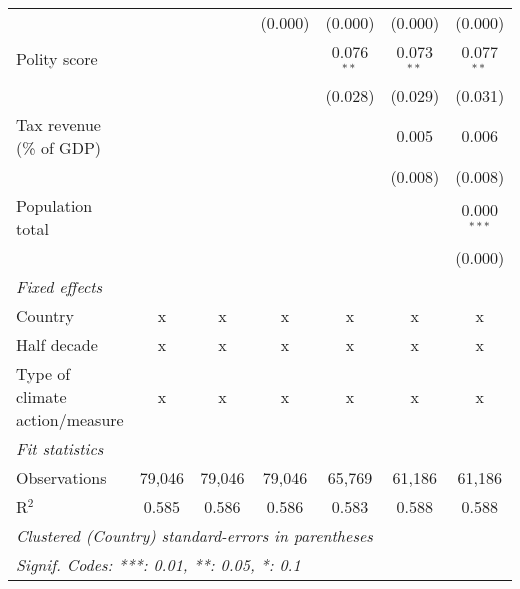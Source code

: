 \begin{tabular}{lcccccc}
                                                                                     &               &               & (0.000)       & (0.000)       & (0.000)       & (0.000)\\   
   Polity score                                                                      &               &               &               & 0.076$^{**}$  & 0.073$^{**}$  & 0.077$^{**}$\\   
                                                                                     &               &               &               & (0.028)       & (0.029)       & (0.031)\\   
   Tax revenue (\% of GDP)                                                           &               &               &               &               & 0.005         & 0.006\\   
                                                                                     &               &               &               &               & (0.008)       & (0.008)\\   
   Population total                                                                  &               &               &               &               &               & 0.000$^{***}$\\   
                                                                                     &               &               &               &               &               & (0.000)\\   
   \emph{Fixed effects}\\
   Country                                                                           & x             & x             & x             & x             & x             & x\\  
   Half decade                                                                       & x             & x             & x             & x             & x             & x\\  
   Type of climate action/measure                                                    & x             & x             & x             & x             & x             & x\\  
   \midrule \emph{Fit statistics}\\
   Observations                                                                      & 79,046        & 79,046        & 79,046        & 65,769        & 61,186        & 61,186\\  
   R$^2$                                                                             & 0.585         & 0.586         & 0.586         & 0.583         & 0.588         & 0.588\\  
   \midrule
   \multicolumn{7}{l}{\emph{Clustered (Country) standard-errors in parentheses}}\\
   \multicolumn{7}{l}{\emph{Signif. Codes: ***: 0.01, **: 0.05, *: 0.1}}\\
\end{tabular}
\par\endgroup


